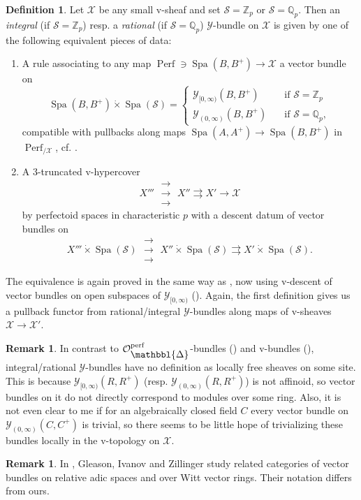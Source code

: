 \documentclass[10pt,twoside]{article}
\numberwithin{equation}{section}
\theoremstyle{plain}
\theoremstyle{definition}
\newtheorem{mydef}[mythm]{Definition}
\newtheorem{myrem}[mythm]{Remark}
\DeclareMathOperator{\Spa}{Spa}
\DeclareMathOperator{\Perf}{Perf}
\newcommand{\ZZ}{\mathbb{Z}}
\newcommand{\QQ}{\mathbb{Q}}
\newcommand{\MCO}{\mathcal{O}}
\newcommand{\MCS}{\mathcal{S}}
\newcommand{\MCX}{\mathcal{X}}
\newcommand{\MCY}{\mathcal{Y}}
\DeclareMathOperator{\perf}{perf}
\newcommand{\Prism}{{\mathlarger{\mathbbl{\Delta}}}}
\newcommand{\Yco}{\MCY_{[0,\infty)}}
\newcommand{\Yoo}{\MCY_{(0,\infty)}}
\newcommand{\OpP}{\MCO^{\perf}_{\Prism}}
\newcommand{\rrrarrows}{\;\substack{\rightarrow\\[-1em] \rightarrow \\[-1em] \rightarrow}\;}
\begin{document}
\begin{mydef}\label{defYBundle}
Let \(\MCX\) be any small v-sheaf and set \(\MCS=\ZZ_p\) or \(\MCS=\QQ_p\). Then an \emph{integral} (if \(\MCS=\ZZ_p\)) resp. a \emph{rational} (if \(\MCS=\QQ_p\)) \(\MCY\)-bundle on \(\MCX\) is given by one of the following equivalent pieces of data:
\begin{enumerate}
    \item A rule associating to any map \(\Perf\ni\Spa(B,B^+)\to \MCX\) a vector bundle on \[\Spa(B,B^+)\dot\times\Spa(\MCS)=
\begin{cases}
\Yco(B,B^+)\quad &\text{if }\MCS=\ZZ_p\\
\Yoo(B,B^+)\quad &\text{if }\MCS=\QQ_p,
\end{cases}\]
compatible with pullbacks along maps \(\Spa(A,A^+)\to \Spa(B,B^+)\) in \(\Perf_{/\MCX}\), cf. .
\item A 3-truncated v-hypercover 
    \[X''' \rrrarrows X''\rightrightarrows X'\longrightarrow \MCX\]
    by perfectoid spaces in characteristic \(p\) with a descent datum of vector bundles on 
    \[X'''\dot\times\Spa(\MCS) \rrrarrows X''\dot\times\Spa(\MCS)\rightrightarrows  X'\dot\times\Spa(\MCS).\]
\end{enumerate}
\end{mydef}

The equivalence is again proved in the same way as , now using v-descent of vector bundles on open subspaces of \(\Yco\) (\cite[Proposition 19.5.3]{SW20}). Again, the first definition gives us a pullback functor from rational/integral \(\MCY\)-bundles along maps of v-sheaves \(\MCX\to \MCX'\).


\begin{myrem}
    In contrast to \(\OpP\)-bundles () and v-bundles (), integral/rational \(\MCY\)-bundles have no definition as locally free sheaves on some site. This is because \(\Yco(R,R^+)\) (resp. \(\Yoo(R,R^+)\)) is not affinoid, so vector bundles on it do not directly correspond to modules over some ring. Also, it is not even clear to me if for an algebraically closed field \(C\) every vector bundle on \(\Yoo(C,C^+)\) is trivial, so there seems to be little hope of trivializing these bundles locally in the v-topology on \(\MCX\).
\end{myrem}




\begin{myrem}\label{ComparisonGI}
    In \cite[Section 3]{GI23}, Gleason, Ivanov and Zillinger study related categories of vector bundles on relative adic spaces and over Witt vector rings. Their notation differs from ours.
\end{myrem}
\end{document}
